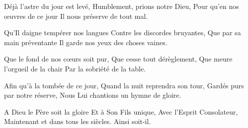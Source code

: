 Déjà l'astre du jour est levé,
Humblement, prions notre Dieu,
Pour qu'en nos œuvres de ce jour
Il nous préserve de tout mal.

Qu'Il daigne tempérer nos langues
Contre les discordes bruyantes,
Que par sa main préventante
Il garde nos yeux des choses vaines.

Que le fond de nos cœurs soit pur,
Que cesse tout dérèglement,
Que meure l'orgueil de la chair
Par la sobriété de la table.

Afin qu'à la tombée de ce jour,
Quand la nuit reprendra son tour,
Gardés purs par notre réserve,
Nous Lui chantions un hymne de gloire.

A Dieu le Père soit la gloire
Et à Son Fils unique,
Avec l'Esprit Consolateur,
Maintenant et dans tous les siècles.
Ainsi soit-il.